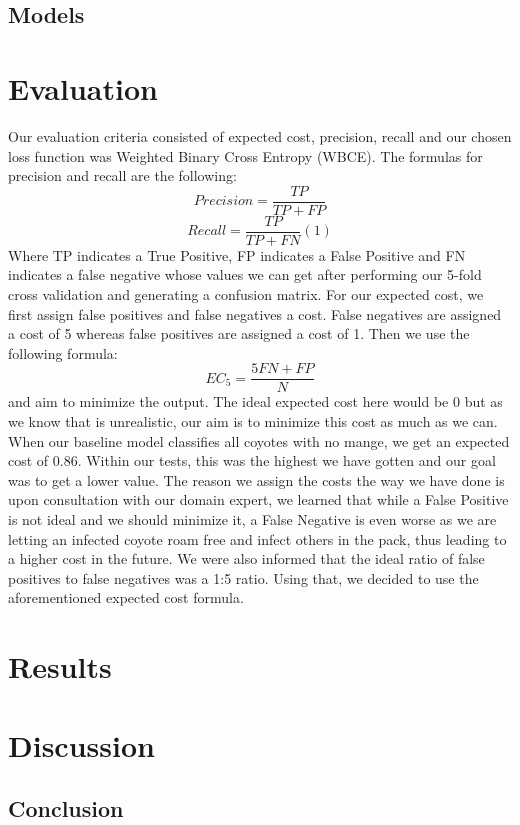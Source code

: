\documentclass{article}
\begin{document}
\subsection{Models}

\section{Evaluation}
Our evaluation criteria consisted of expected cost, precision, recall and our chosen loss function was Weighted Binary Cross Entropy (WBCE). The formulas for precision and recall are the following:
\[Precision = \frac{TP}{TP+FP}\]
\[Recall = \frac{TP}{TP+FN}	    (1)\]     %
Where TP indicates a True Positive, FP indicates a False Positive and FN indicates a false negative whose values we can get after performing our 5-fold cross validation and generating a confusion matrix. For our expected cost, we first assign false positives and false negatives a cost. False negatives are assigned a cost of 5 whereas false positives are assigned a cost of 1. Then we use the following formula:
\[EC_5 = \frac{5FN + FP}{N}\]
and aim to minimize the output. The ideal expected cost here would be 0 but as we know that is unrealistic, our aim is to minimize this cost as much as we can. When our baseline model classifies all coyotes with no mange, we get an expected cost of 0.86. Within our tests, this was the highest we have gotten and our goal was to get a lower value.  The reason we assign the costs the way we have done is upon consultation with our domain expert, we learned that while a False Positive is not ideal and we should minimize it, a False Negative is even worse as we are letting an infected coyote roam free and infect others in the pack, thus leading to a higher cost in the future. We were also informed that the ideal ratio of false positives to false negatives was a 1:5 ratio. Using that, we decided to use the aforementioned expected cost formula.

\section{Results}

\section{Discussion}

\subsection{Conclusion}
\end{document}
